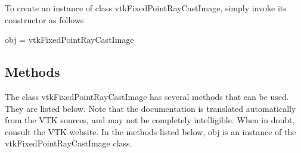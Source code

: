To create an instance of class vtk\-Fixed\-Point\-Ray\-Cast\-Image, simply invoke its constructor as follows \begin{DoxyVerb}  obj = vtkFixedPointRayCastImage
\end{DoxyVerb}
 \hypertarget{vtkwidgets_vtkxyplotwidget_Methods}{}\subsection{Methods}\label{vtkwidgets_vtkxyplotwidget_Methods}
The class vtk\-Fixed\-Point\-Ray\-Cast\-Image has several methods that can be used. They are listed below. Note that the documentation is translated automatically from the V\-T\-K sources, and may not be completely intelligible. When in doubt, consult the V\-T\-K website. In the methods listed below, {\ttfamily obj} is an instance of the vtk\-Fixed\-Point\-Ray\-Cast\-Image class. 

